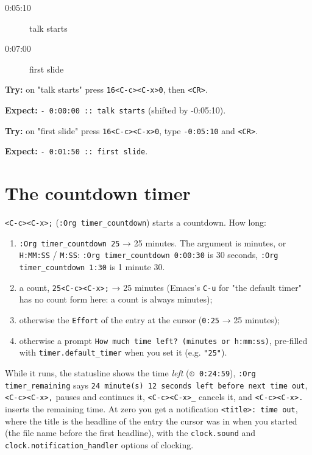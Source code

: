 \begin{description}
\item[{0:05:10}] talk starts
\item[{0:07:00}] first slide
\end{description}

\textbf{Try:} on "talk starts" press \texttt{16<C-c><C-x>0}, then \texttt{<CR>}.

\textbf{Expect:} \texttt{- 0:00:00 :: talk starts} (shifted by -0:05:10).

\textbf{Try:} on "first slide" press \texttt{16<C-c><C-x>0}, type \texttt{-0:05:10} and \texttt{<CR>}.

\textbf{Expect:} \texttt{- 0:01:50 :: first slide}.
\section{The countdown timer}
\label{sec:orgd54f3f3}
\texttt{<C-c><C-x>;} (\texttt{:Org timer\_countdown}) starts a countdown. How long:

\begin{enumerate}
\item \texttt{:Org timer\_countdown 25} → 25 minutes. The argument is minutes, or
\texttt{H:MM:SS} / \texttt{M:SS}: \texttt{:Org timer\_countdown 0:00:30} is 30 seconds,
\texttt{:Org timer\_countdown 1:30} is 1 minute 30.
\item a count, \texttt{25<C-c><C-x>;} → 25 minutes (Emacs's \texttt{C-u} for "the default
timer" has no count form here: a count is always minutes);
\item otherwise the \texttt{Effort} of the entry at the cursor (\texttt{0:25} → 25 minutes);
\item otherwise a prompt \texttt{How much time left? (minutes or h:mm:ss)},
pre-filled with \texttt{timer.default\_timer} when you set it (e.g. \texttt{"25"}).
\end{enumerate}

While it runs, the statusline shows the time \emph{left} (\texttt{⏲ 0:24:59}),
\texttt{:Org timer\_remaining} says \texttt{24 minute(s) 12 seconds left before next time
out}, \texttt{<C-c><C-x>,} pauses and continues it, \texttt{<C-c><C-x>\_} cancels it, and
\texttt{<C-c><C-x>.} inserts the remaining time. At zero you get a notification
\texttt{<title>: time out}, where the title is the headline of the entry the
cursor was in when you started (the file name before the first headline),
with the
\texttt{clock.sound} and \texttt{clock.notification\_handler} options of clocking.

